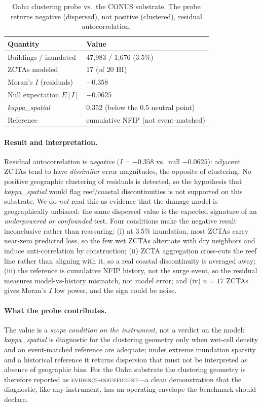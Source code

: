 \begin{table}[h]
\centering
\caption{Oahu clustering probe vs.\ the CONUS substrate. The probe returns
  negative (dispersed), not positive (clustered), residual autocorrelation.}
\label{app:tab:oahu}
\small
\begin{tabular}{@{}ll@{}}
\toprule
\textbf{Quantity} & \textbf{Value} \\
\midrule
Buildings / inundated        & 47{,}983 / 1{,}676 (3.5\%) \\
ZCTAs modeled                & 17 (of 20 HI) \\
Moran's $I$ (residuals)      & $-0.358$ \\
Null expectation $E[I]$      & $-0.0625$ \\
\textit{kappa\_spatial}      & $0.352$ (below the 0.5 neutral point) \\
Reference                    & cumulative NFIP (not event-matched) \\
\bottomrule
\end{tabular}
\end{table}

\paragraph{Result and interpretation.} Residual autocorrelation is
\emph{negative} ($I=-0.358$ vs.\ null $-0.0625$): adjacent ZCTAs tend to have
\emph{dissimilar} error magnitudes, the opposite of clustering. No positive
geographic clustering of residuals is detected, so the hypothesis that
\textit{kappa\_spatial} would flag reef/coastal discontinuities is not
supported on this substrate. We do \emph{not} read this as evidence that the
damage model is geographically unbiased: the same dispersed value is the
expected signature of an \emph{underpowered or confounded} test. Four
conditions make the negative result inconclusive rather than reassuring:
(i) at 3.5\% inundation, most ZCTAs carry near-zero predicted loss, so the
few wet ZCTAs alternate with dry neighbors and induce anti-correlation by
construction; (ii) ZCTA aggregation cross-cuts the reef line rather than
aligning with it, so a real coastal discontinuity is averaged away;
(iii) the reference is cumulative NFIP history, not the surge event, so the
residual measures model-vs-history mismatch, not model error; and
(iv) $n{=}17$ ZCTAs gives Moran's $I$ low power, and the sign could be noise.

\paragraph{What the probe contributes.} The value is a \emph{scope condition
on the instrument}, not a verdict on the model: \textit{kappa\_spatial} is
diagnostic for the clustering geometry only when wet-cell density and an
event-matched reference are adequate; under extreme inundation sparsity and a
historical reference it returns dispersion that must not be interpreted as
absence of geographic bias. For the Oahu substrate the clustering geometry is
therefore reported as \textsc{evidence-insufficient}---a clean demonstration
that the diagnostic, like any instrument, has an operating envelope the
benchmark should declare.

